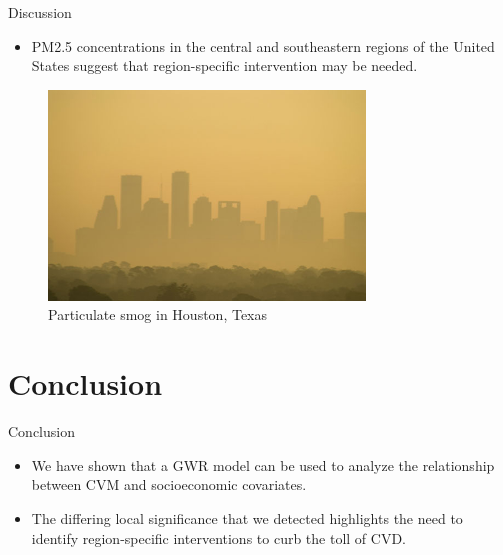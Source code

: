 \documentclass[
  ignorenonframetext,
]{beamer}
\providecommand{\tightlist}{%
  \setlength{\itemsep}{0pt}\setlength{\parskip}{0pt}}\usepackage{longtable,booktabs,array}
\begin{document}
\begin{frame}{Discussion}
\label{discussion-3}
\begin{itemize}
\tightlist
\item
  PM2.5 concentrations in the central and southeastern regions of the
  United States suggest that region-specific intervention may be needed.
\end{itemize}

\begin{figure}[H]

{\centering \includegraphics[width=0.75\textwidth,height=\textheight]{PresentationPhotos/Houston-Smog.jpg}

}

\caption{Particulate smog in Houston, Texas}

\end{figure}%
\end{frame}

\section{Conclusion}\label{conclusion}

\begin{frame}{Conclusion}
\label{conclusion-1}
\begin{itemize}
\item
  We have shown that a GWR model can be used to analyze the relationship
  between CVM and socioeconomic covariates.
\item
  The differing local significance that we detected highlights the need
  to identify region-specific interventions to curb the toll of CVD.
\end{itemize}
\end{frame}
\end{document}
